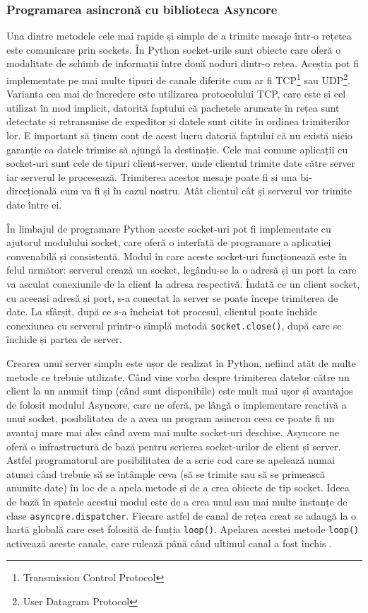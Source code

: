 \documentclass[../IoMusT.tex]{subfiles}
\begin{document}
\subsubsection{Programarea asincronă cu biblioteca Asyncore}
Una dintre metodele cele mai rapide și simple de a trimite mesaje într-o rețetea este comunicare prin sockets. În Python socket-urile sunt obiecte care oferă o modalitate de schimb de informații între două noduri dintr-o rețea. Aceștia pot fi implementate pe mai multe tipuri de canale diferite cum ar fi TCP\footnote{Transmission Control Protocol} sau UDP\footnote{User Datagram Protocol}. Varianta cea mai de încredere este utilizarea protocolului TCP, care este și cel utilizat în mod implicit, datorită faptului că pachetele aruncate în rețea sunt detectate și retransmise de expeditor și datele sunt citite în ordinea trimiterilor lor. E important să ținem cont de acest lucru datoriă faptului că nu există nicio garanție ca datele trimise să ajungă la destinație. Cele mai comune aplicații cu socket-uri sunt cele de tipuri client-server, unde clientul trimite date către server iar serverul le procesează. Trimiterea acestor mesaje poate fi și una bi-direcțională cum va fi și în cazul nostru. Atât clientul cât și serverul vor trimite date între ei.
\\
\par În limbajul de programare Python aceste socket-uri pot fi implementate cu ajutorul modulului socket, care oferă o interfață de programare a aplicației convenabilă și consistentă. Modul în care aceste socket-uri funcționează este în felul următor: serverul crează un socket, legându-se la o adresă și un port la care va asculat conexiunile de la client la adresa respectivă. Îndată ce un client socket, cu aceeași adresă și port, s-a conectat la server se poate începe trimiterea de date. La sfârșit, după ce s-a încheiat tot procesul, clientul poate închide conexiunea cu serverul printr-o simplă metodă \verb|socket.close()|, după care se închide și partea de server.
\\
\par Crearea unui server simplu este ușor de realizat în Python, nefiind atăt de multe metode ce trebuie utilizate. Când vine vorba despre trimiterea datelor către un client la un anumit timp (când sunt disponibile) este mult mai ușor și avantajos de folosit modulul Asyncore, care ne oferă, pe lângă o implementare reactivă a unui socket, posibilitatea de a avea un program asincron ceea ce poate fi un avantaj mare mai ales când avem mai multe socket-uri deschise. Asyncore ne oferă o infrastructură de bază pentru scrierea socket-urilor de client și server. Astfel programatorul are posibilitatea de a scrie cod care se apelează numai atunci când trebuie să se întâmple ceva (să se trimite sau să se primească anumite date) în loc de a apela metode și de a crea obiecte de tip socket. Ideea de bază în spatele acestui modul este de a crea unul sau mai multe instanțe de clase \verb|asyncore.dispatcher|. Fiecare astfel de canal de rețea creat se adaugă la o hartă globală care eset folosită de funția \verb|loop()|. Apelarea acestei metode \verb|loop()| activează aceste canale, care rulează până când ultimul canal a fost închis \cite{Async}.
\end{document}
